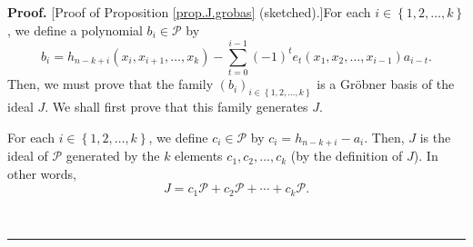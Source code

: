 \documentclass[numbers=enddot,12pt,final,onecolumn,notitlepage]{scrartcl}%
\theoremstyle{definition}
\newenvironment{proof}[1][Proof]{\noindent\textbf{#1.} }{\ \rule{0.5em}{0.5em}}
\let\sumnonlimits\sum
\renewcommand{\sum}{\sumnonlimits\limits}
\begin{document}
\begin{proof}
[Proof of Proposition \ref{prop.J.grobas} (sketched).]For each $i\in\left\{
1,2,\ldots,k\right\}  $, we define a polynomial $b_{i}\in\mathcal{P}$ by%
\[
b_{i}=h_{n-k+i}\left(  x_{i},x_{i+1},\ldots,x_{k}\right)  -\sum_{t=0}%
^{i-1}\left(  -1\right)  ^{t}e_{t}\left(  x_{1},x_{2},\ldots,x_{i-1}\right)
a_{i-t}.
\]
Then, we must prove that the family $\left(  b_{i}\right)  _{i\in\left\{
1,2,\ldots,k\right\}  }$ is a Gr\"{o}bner basis of the ideal $J$. We shall
first prove that this family generates $J$.

For each $i\in\left\{  1,2,\ldots,k\right\}  $, we define $c_{i}\in
\mathcal{P}$ by $c_{i}=h_{n-k+i}-a_{i}$. Then, $J$ is the ideal of
$\mathcal{P}$ generated by the $k$ elements $c_{1},c_{2},\ldots,c_{k}$ (by the
definition of $J$). In other words,%
\begin{equation}
J=c_{1}\mathcal{P}+c_{2}\mathcal{P}+\cdots+c_{k}\mathcal{P}.
\label{pf.prop.J.grobas.J=1}%
\end{equation}



\end{proof}
\end{document}
